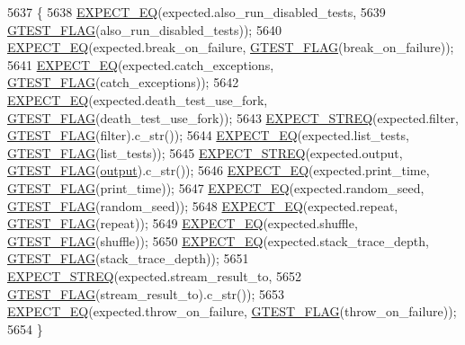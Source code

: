 \begin{DoxyCode}
5637                                                 \{
5638     \hyperlink{gtest_8h_a4159019abda84f5366acdb7604ff220a}{EXPECT\_EQ}(expected.also\_run\_disabled\_tests,
5639               \hyperlink{gtest-port_8h_a828f4e34a1c4b510da50ec1563e3562a}{GTEST\_FLAG}(also\_run\_disabled\_tests));
5640     \hyperlink{gtest_8h_a4159019abda84f5366acdb7604ff220a}{EXPECT\_EQ}(expected.break\_on\_failure, \hyperlink{gtest-port_8h_a828f4e34a1c4b510da50ec1563e3562a}{GTEST\_FLAG}(break\_on\_failure));
5641     \hyperlink{gtest_8h_a4159019abda84f5366acdb7604ff220a}{EXPECT\_EQ}(expected.catch\_exceptions, \hyperlink{gtest-port_8h_a828f4e34a1c4b510da50ec1563e3562a}{GTEST\_FLAG}(catch\_exceptions));
5642     \hyperlink{gtest_8h_a4159019abda84f5366acdb7604ff220a}{EXPECT\_EQ}(expected.death\_test\_use\_fork, \hyperlink{gtest-port_8h_a828f4e34a1c4b510da50ec1563e3562a}{GTEST\_FLAG}(death\_test\_use\_fork));
5643     \hyperlink{gtest_8h_ad20f7b94ac5081e16f0005b94e95f0c6}{EXPECT\_STREQ}(expected.filter, \hyperlink{gtest-port_8h_a828f4e34a1c4b510da50ec1563e3562a}{GTEST\_FLAG}(filter).c\_str());
5644     \hyperlink{gtest_8h_a4159019abda84f5366acdb7604ff220a}{EXPECT\_EQ}(expected.list\_tests, \hyperlink{gtest-port_8h_a828f4e34a1c4b510da50ec1563e3562a}{GTEST\_FLAG}(list\_tests));
5645     \hyperlink{gtest_8h_ad20f7b94ac5081e16f0005b94e95f0c6}{EXPECT\_STREQ}(expected.output, \hyperlink{gtest-port_8h_a828f4e34a1c4b510da50ec1563e3562a}{GTEST\_FLAG}(\hyperlink{namespacegmock__output__test_a4277f8598ba3835393fe82e82d09375d}{output}).c\_str());
5646     \hyperlink{gtest_8h_a4159019abda84f5366acdb7604ff220a}{EXPECT\_EQ}(expected.print\_time, \hyperlink{gtest-port_8h_a828f4e34a1c4b510da50ec1563e3562a}{GTEST\_FLAG}(print\_time));
5647     \hyperlink{gtest_8h_a4159019abda84f5366acdb7604ff220a}{EXPECT\_EQ}(expected.random\_seed, \hyperlink{gtest-port_8h_a828f4e34a1c4b510da50ec1563e3562a}{GTEST\_FLAG}(random\_seed));
5648     \hyperlink{gtest_8h_a4159019abda84f5366acdb7604ff220a}{EXPECT\_EQ}(expected.repeat, \hyperlink{gtest-port_8h_a828f4e34a1c4b510da50ec1563e3562a}{GTEST\_FLAG}(repeat));
5649     \hyperlink{gtest_8h_a4159019abda84f5366acdb7604ff220a}{EXPECT\_EQ}(expected.shuffle, \hyperlink{gtest-port_8h_a828f4e34a1c4b510da50ec1563e3562a}{GTEST\_FLAG}(shuffle));
5650     \hyperlink{gtest_8h_a4159019abda84f5366acdb7604ff220a}{EXPECT\_EQ}(expected.stack\_trace\_depth, \hyperlink{gtest-port_8h_a828f4e34a1c4b510da50ec1563e3562a}{GTEST\_FLAG}(stack\_trace\_depth));
5651     \hyperlink{gtest_8h_ad20f7b94ac5081e16f0005b94e95f0c6}{EXPECT\_STREQ}(expected.stream\_result\_to,
5652                  \hyperlink{gtest-port_8h_a828f4e34a1c4b510da50ec1563e3562a}{GTEST\_FLAG}(stream\_result\_to).c\_str());
5653     \hyperlink{gtest_8h_a4159019abda84f5366acdb7604ff220a}{EXPECT\_EQ}(expected.throw\_on\_failure, \hyperlink{gtest-port_8h_a828f4e34a1c4b510da50ec1563e3562a}{GTEST\_FLAG}(throw\_on\_failure));
5654   \}
\end{DoxyCode}
